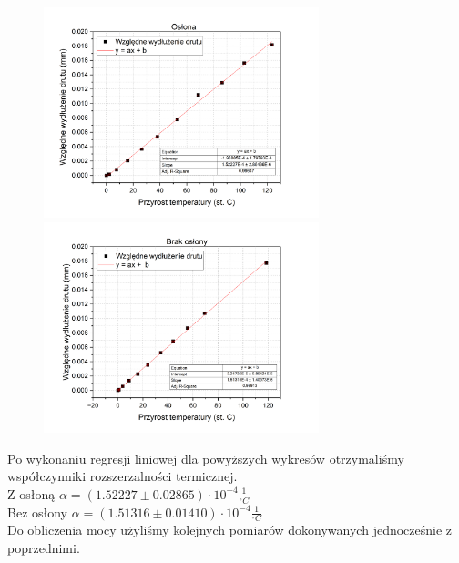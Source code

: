 \newpage
\begin{figure}[!ht]
    \centering
    \includegraphics[width = 80mm]{imgs/Graph1.png}
    \includegraphics[width = 80mm]{imgs/Graph2.png}
    \label{fig:wykresy_dlugosci}
\end{figure}

Po wykonaniu regresji liniowej dla powyższych wykresów otrzymaliśmy współczynniki rozszerzalności termicznej. \\

\indent\indent Z osłoną   $\alpha = (1.52227 \pm 0.02865) \cdot 10^{-4} \frac{1}{^{\circ}C}$ \\
\indent\indent Bez osłony $\alpha = (1.51316 \pm 0.01410) \cdot 10^{-4} \frac{1}{^{\circ}C}$ \\

Do obliczenia mocy użyliśmy kolejnych pomiarów dokonywanych jednocześnie z poprzednimi.

